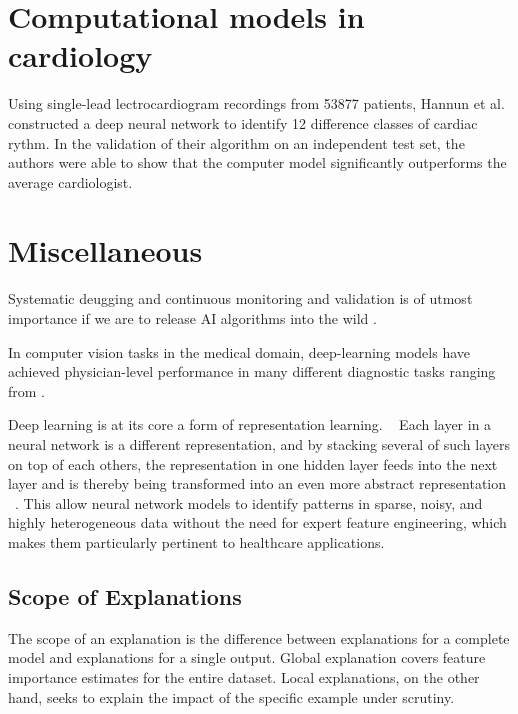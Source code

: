 \section{Computational models in cardiology}

Using single-lead lectrocardiogram recordings from \num{53877} patients,
Hannun et al.\autocite{hannunCardiologistlevel2019}
constructed a deep neural network
to identify 12 difference classes of cardiac rythm.
In the validation of their algorithm on an independent test set,
the authors were able to show that the computer model
significantly outperforms the average cardiologist. 





\section{Miscellaneous}

Systematic deugging and continuous monitoring and validation 
is of utmost importance if we are to release AI algorithms into the wild%
\autocite{topolHighperformance2019}.

In computer vision tasks in the medical domain,
deep-learning models have achieved physician-level performance
in many different diagnostic tasks
ranging from .


Deep learning is at its core a form of representation learning.
~\autocite{estevaGuide2019}
Each layer in a neural network is a different representation,
and by stacking several of such layers on top of each others,
the representation in one hidden layer
feeds into the next layer and
is thereby being transformed into an even more abstract representation%
~\autocite{estevaGuide2019}.
This allow neural network models to identify patterns in sparse, noisy,
and highly heterogeneous data without the need for expert feature engineering,
which makes them particularly pertinent to healthcare applications.%
~



\subsection{Scope of Explanations}

The scope of an explanation is the difference between
explanations for a complete model and
explanations for a single output.
Global explanation covers feature importance estimates 
for the entire dataset.
Local explanations, on the other hand, seeks to explain
the impact of the specific example under scrutiny.

